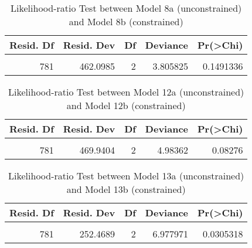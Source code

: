 \documentclass[
]{article}
\begin{document}
\begin{table}[!h]

\caption{\label{tab:unnamed-chunk-103}Likelihood-ratio Test between Model 8a (unconstrained) and Model 8b (constrained)
                  \label{table:lrtest_2_lv}}
\centering
\begin{tabular}[t]{r|r|r|r|r}
\hline
Resid. Df & Resid. Dev & Df & Deviance & Pr(>Chi)\\
\hline
\cellcolor{gray!6}{783} & \cellcolor{gray!6}{465.9043} & \cellcolor{gray!6}{} & \cellcolor{gray!6}{} & \cellcolor{gray!6}{}\\
\hline
781 & 462.0985 & 2 & 3.805825 & 0.1491336\\
\hline
\end{tabular}
\end{table}

\begin{table}[!h]

\caption{\label{tab:unnamed-chunk-103}Likelihood-ratio Test between Model 12a (unconstrained) and Model 12b (constrained)
                  \label{table:lrtest_3_lv}}
\centering
\begin{tabular}[t]{r|r|r|r|r}
\hline
Resid. Df & Resid. Dev & Df & Deviance & Pr(>Chi)\\
\hline
\cellcolor{gray!6}{783} & \cellcolor{gray!6}{474.9240} & \cellcolor{gray!6}{} & \cellcolor{gray!6}{} & \cellcolor{gray!6}{}\\
\hline
781 & 469.9404 & 2 & 4.98362 & 0.08276\\
\hline
\end{tabular}
\end{table}

\begin{table}[!h]

\caption{\label{tab:unnamed-chunk-103}Likelihood-ratio Test between Model 13a (unconstrained) and Model 13b (constrained)
                  \label{table:lrtest_4_lv}}
\centering
\begin{tabular}[t]{r|r|r|r|r}
\hline
Resid. Df & Resid. Dev & Df & Deviance & Pr(>Chi)\\
\hline
\cellcolor{gray!6}{783} & \cellcolor{gray!6}{259.4469} & \cellcolor{gray!6}{} & \cellcolor{gray!6}{} & \cellcolor{gray!6}{}\\
\hline
781 & 252.4689 & 2 & 6.977971 & 0.0305318\\
\hline
\end{tabular}
\end{table}
\end{document}
